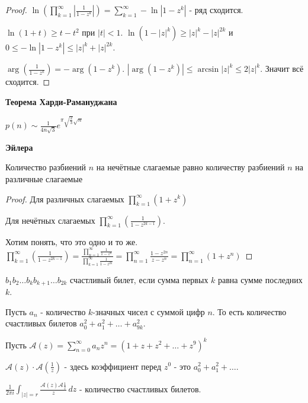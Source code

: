 \begin{proof}
    $\ln \left (\prod_{k=1}^{\infty} \left | \frac{1}{1 - z^k} \right | \right ) = \sum_{k=1}^{\infty} -\ln |1 - z^k|$ - ряд сходится.

    $\ln (1 + t) \geqslant t - t^2$ при $|t| < 1$. $\ln (1 - |z|^k) \geqslant |z|^k - |z|^{2k}$ и 
    $0 \leqslant -\ln |1 - z^k| \leqslant |z|^k + |z|^{2k}$.

    $\arg \left ( \frac{1}{1 - z^k} \right ) = -\arg (1 - z^k)$. $|\arg (1 - z^k)| \leqslant \arcsin |z|^k \leqslant 2|z|^k$.
    Значит всё сходится.
\end{proof}

\begin{remark}
    \textbf{Теорема Харди-Рамануджана}

    $p(n) \sim \frac{1}{4n\sqrt{3}} e^{\pi \sqrt{\frac{2}{3}}\sqrt{n}}$
\end{remark}

\begin{theorem}
    \textbf{Эйлера}

    Количество разбиений $n$ на нечётные слагаемые равно количеству разбиений
    $n$ на различные слагаемые
\end{theorem}

\begin{proof}
    Для различных слагаемых $\prod_{k = 1}^{\infty} (1+z^k)$

    Для нечётных слагаемых $\prod_{k = 1}^{\infty} (\frac{1}{1 - z^{2k -1}})$.

    Хотим понять, что это одно и то же.$\prod_{k = 1}^{\infty} (\frac{1}{1 - z^{2k -1}}) =
    \frac{\prod_{n = 1}^{\infty} \frac{1}{1-z^n}}{\prod_{k = 1}^{\infty} \frac{1}{1-z^{2k}}} =
    \prod_{n = 1}^{\infty} \frac{1 - z^{2n}}{z - z^n} = \prod_{n = 1}^{\infty} (1 + z^n)$
\end{proof}

\begin{example}
    $b_1b_2 \ldots b_k b_{k + 1} \ldots b_{2k}$ счастливый билет, если 
    сумма первых $k$ равна сумме последних $k$.

    Пусть $a_n$ - количество $k$-значных чисел с суммой цифр $n$. То есть 
    количество счастливых билетов $a_0^2 + a_1^2 + \ldots + a_{9k}^2$.

    Пусть $\mathcal{A}(z) = \sum_{n = 0}^{\infty} a_nz^n = (1 + z + z^2 + \ldots + z^9)^k$

    $\mathcal{A}(z) \cdot \mathcal{A}(\frac{1}{z})$ - здесь коэффициент перед $z^0$ - это $a_0^2 + a_1^2 + \ldots$.

    $\frac{1}{2\pi i} \int_{|z| = r} \frac{\mathcal{A}(z) \mathcal{A}\frac{1}{z}}{z} \, dz$ - количество счастливых билетов.
\end{example}

